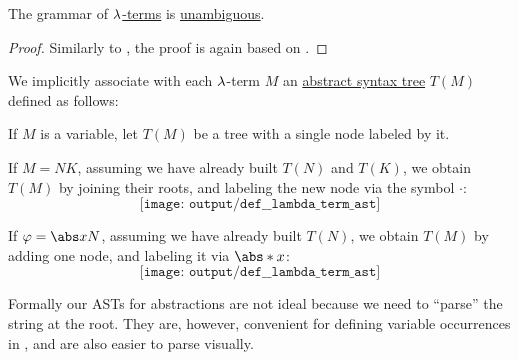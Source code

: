 \begin{proposition}\label{thm:lambda_terms_are_unambiguous}
  The grammar of \hyperref[def:lambda_term]{\( \mathrm{\lambda} \)-terms} is \hyperref[def:grammar_ambiguity]{unambiguous}.
\end{proposition}
\begin{proof}
  Similarly to , the proof is again based on .
\end{proof}

\begin{definition}\label{def:lambda_term_ast}
  We implicitly associate with each \( \mathrm{\lambda} \)-term \( M \) an \hyperref[con:abstract_syntax_tree]{abstract syntax tree} \( T(M) \) defined as follows:
  \begin{thmenum}
     If \( M \) is a variable, let \( T(M) \) be a tree with a single node labeled by it.

     If \( M = NK \), assuming we have already built \( T(N) \) and \( T(K) \), we obtain \( T(M) \) by joining their roots, and labeling the new node via the symbol \( \cdot \):
    \begin{equation*}
      \texttt{[image: output/def\_\_lambda\_term\_ast]}
    \end{equation*}

     If \( \varphi = \abs x N \), assuming we have already built \( T(N) \), we obtain \( T(M) \) by adding one node, and labeling it via \( \abs* x \):
    \begin{equation*}
      \texttt{[image: output/def\_\_lambda\_term\_ast]}
    \end{equation*}
  \end{thmenum}
\end{definition}
\begin{comments}
  \item Formally our ASTs for abstractions are not ideal because we need to \enquote{parse} the string at the root. They are, however, convenient for defining variable occurrences in , and are also easier to parse visually.
\end{comments}

